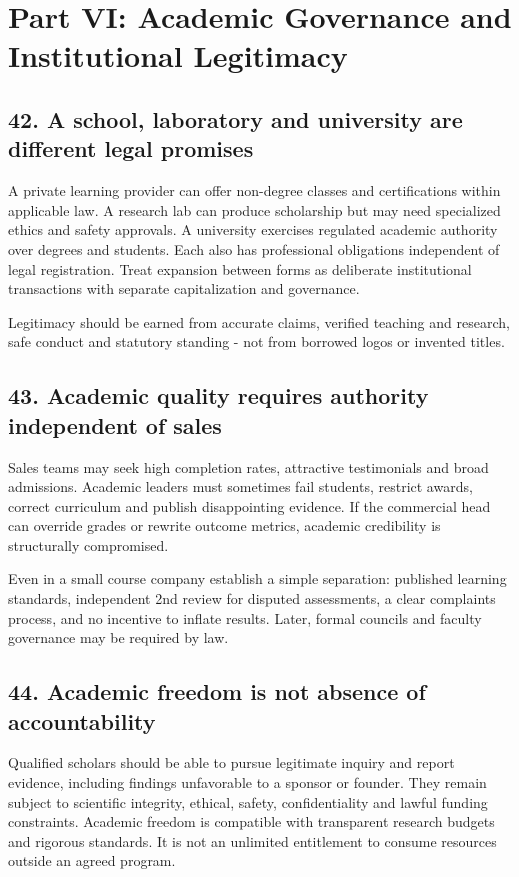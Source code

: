 \section*{Part VI: Academic Governance and Institutional Legitimacy}

\subsection{42. A school, laboratory and university are different legal promises}

A private learning provider can offer non-degree classes and certifications within applicable law. A research lab can produce scholarship but may need specialized ethics and safety approvals. A university exercises regulated academic authority over degrees and students. Each also has professional obligations independent of legal registration. Treat expansion between forms as deliberate institutional transactions with separate capitalization and governance.

Legitimacy should be earned from accurate claims, verified teaching and research, safe conduct and statutory standing - not from borrowed logos or invented titles.

\subsection{43. Academic quality requires authority independent of sales}

Sales teams may seek high completion rates, attractive testimonials and broad admissions. Academic leaders must sometimes fail students, restrict awards, correct curriculum and publish disappointing evidence. If the commercial head can override grades or rewrite outcome metrics, academic credibility is structurally compromised.

Even in a small course company establish a simple separation: published learning standards, independent 2nd review for disputed assessments, a clear complaints process, and no incentive to inflate results. Later, formal councils and faculty governance may be required by law.

\subsection{44. Academic freedom is not absence of accountability}

Qualified scholars should be able to pursue legitimate inquiry and report evidence, including findings unfavorable to a sponsor or founder. They remain subject to scientific integrity, ethical, safety, confidentiality and lawful funding constraints. Academic freedom is compatible with transparent research budgets and rigorous standards. It is not an unlimited entitlement to consume resources outside an agreed program.

